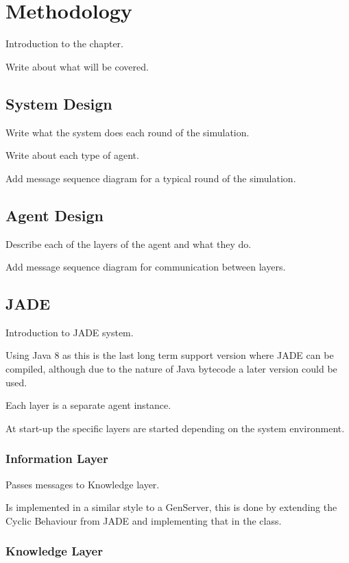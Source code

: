 \section{Methodology}

Introduction to the chapter.

Write about what will be covered.

\subsection{System Design}

Write what the system does each round of the simulation.

Write about each type of agent.

Add message sequence diagram for a typical round of the simulation.

\subsection{Agent Design}

Describe each of the layers of the agent and what they do.

Add message sequence diagram for communication between layers.



\subsection{JADE}

Introduction to JADE system.

Using Java 8 as this is the last long term support version where JADE can be compiled, although due to the nature of Java bytecode a later version could be used.

Each layer is a separate agent instance.

At start-up the specific layers are started depending on the system environment.

\subsubsection{Information Layer}

Passes messages to Knowledge layer.

Is implemented in a similar style to a GenServer, this is done by extending the Cyclic Behaviour from JADE and implementing that in the class.

\subsubsection{Knowledge Layer}

